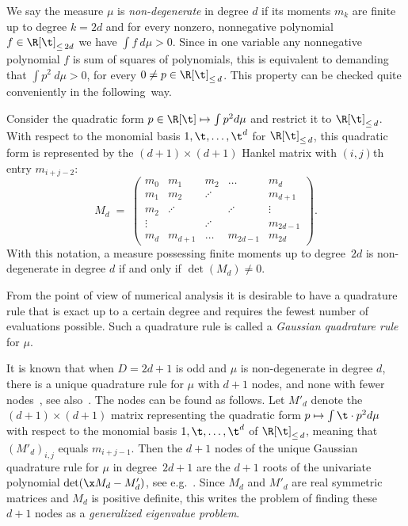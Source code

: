 We say the measure $\mu$ is \emph{non-degenerate} in degree $d$ if its moments $m_k$ are finite up to degree $k=2d$ and for every nonzero, nonnegative polynomial $ f\in \R[\t]_{\leq\,2d}$ we have $\int f \ d\mu >0$. Since in one variable any nonnegative polynomial $f$ is sum of squares of polynomials, this is equivalent to demanding that $\int p^2 \ d\mu >0$, for every $0\neq p\in \R[\t]_{\leq\,d}$. This property can be checked quite conveniently in the following~way.


\begin{defi} \label{def:Mmatrix}
Consider the quadratic form $p\in \R[\t]\mapsto\int p^2 d\mu$ and restrict it to $\R[\t]_{\leq\,d}$. With respect to the monomial basis $1,\t,\hdots, \t^d$ for $\R[\t]_{\leq\,d}$, this quadratic form is represented by the $(d+1)\times (d+1)$ Hankel matrix with $(i,j)$th entry $m_{i+j-2}$:
\[
M_d \; = \;
\begin{pmatrix}
m_0 & m_1 & m_2 & \hdots &m_d \\
m_1 & m_2 & \iddots&&m_{d+1} \\
m_2 & \iddots& &\iddots&\vdots\\
\vdots&&\iddots&&m_{2d-1}\\
m_d &m_{d+1}&\hdots&m_{2d-1}&m_{2d}
\end{pmatrix}.
\]
With this notation, a measure possessing finite moments up to degree~$2d$ is non-degenerate in degree $d$ if and only if $\det(M_d)\neq 0$.
\end{defi}


From the point of view of numerical analysis it is desirable to have a quadrature rule that is exact up to a certain degree and requires the fewest number of evaluations possible. Such a quadrature rule is called a \emph{Gaussian quadrature rule} for $\mu$.

It is known that when $D=2d+1$ is odd and $\mu$ is non-degenerate in degree $d$, there is a unique quadrature rule for $\mu$ with $d+1$ nodes, and none with fewer nodes~\cite[Chapter~I, Theorem.~3]{anheizer}, see also~\cite[Theorem.~3.8]{curto}. The nodes can be found as follows. Let $M'_d$ denote the $(d+1)\times(d+1)$ matrix representing the quadratic form $p\mapsto \int \t \cdot p^2 d \mu$ with respect to the monomial basis $1,\t,\hdots, \t^d$ of $\R[\t]_{\leq \,d}$, meaning that $(M'_d)_{i,j}$ equals $m_{i+j-1}$. Then the $d+1$ nodes of the unique Gaussian quadrature rule for $\mu$ in degree~$2d+1$ are the $d+1$ roots of the univariate polynomial $\det(\x M_d - M_d') $, see e.g.~\cite[formule 2.2.9, p.~27]{sze}. Since $M_d$ and $M'_d$ are real symmetric matrices and $M_d$ is positive definite, this writes the problem of finding these $d+1$ nodes as a
\emph{generalized eigenvalue problem}.


